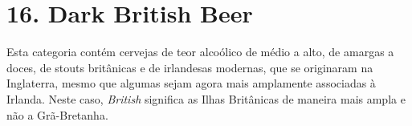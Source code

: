 \section*{16. Dark British Beer}

Esta categoria contém cervejas de teor alcoólico de médio a alto, de amargas a doces, de stouts britânicas e de irlandesas modernas, que se originaram na Inglaterra, mesmo que algumas sejam agora mais amplamente associadas à Irlanda. Neste caso, \textit{British} significa as Ilhas Britânicas de maneira mais ampla e não a Grã-Bretanha.
